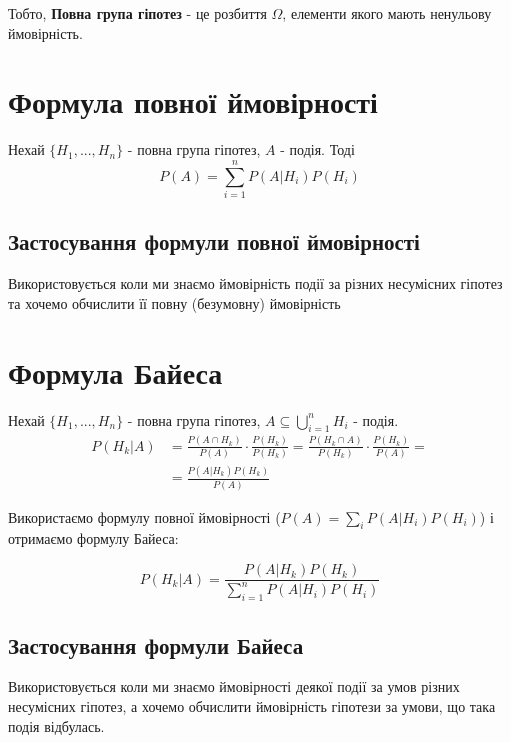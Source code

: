 \documentclass[11pt, a4paper]{article} %
\begin{document}
Тобто, \textbf{Повна група гіпотез} - це розбиття $\Omega$, елементи якого мають ненульову ймовірність.

\section*{Формула повної ймовірності}
\begin{mdframed}
Нехай $\{H_1, ..., H_n\}$ - повна група гіпотез, $A$ - подія. Тоді
$$P(A) = \sum_{i=1}^n P(A|H_i)P(H_i)$$
\end{mdframed}

\subsection*{Застосування формули повної ймовірності}
Використовується коли ми знаємо ймовірність події за різних несумісних гіпотез
та хочемо обчислити її повну (безумовну) ймовірність 

\section*{Формула Байеса}
Нехай $\{H_1, ..., H_n\}$ - повна група гіпотез, $A \subseteq \bigcup_{i=1}^n H_i$ - подія.
\begin{align*}
    P(H_k|A) &= \frac{P(A\cap H_k)}{P(A)} \cdot \frac{P(H_k)}{P(H_k)}
    = \frac{P(H_k\cap A)}{P(H_k)} \cdot \frac{P(H_k)}{P(A)} =\\
    &= \frac{P(A|H_k)P(H_k)}{P(A)}
\end{align*}

\pagebreak
Використаємо формулу повної ймовірності ($P(A) = \sum_i P(A|H_i)P(H_i)$)
і отримаємо формулу Байеса:
\begin{mdframed}
$$    P(H_k|A) = \frac{P(A|H_k)P(H_k)}{\sum_{i=1}^n P(A|H_i)P(H_i)}$$
\end{mdframed}

\subsection*{Застосування формули Байеса}
Використовується коли ми знаємо ймовірності деякої події за умов різних несумісних гіпотез,
а хочемо обчислити ймовірність гіпотези за умови, що така подія відбулась.
\end{document}
